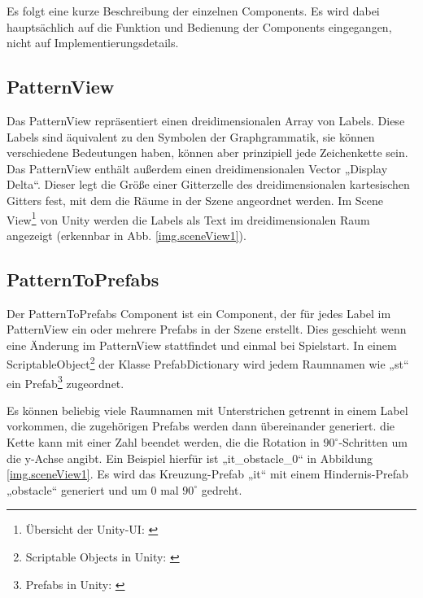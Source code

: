
Es folgt eine kurze Beschreibung der einzelnen Components. Es wird dabei hauptsächlich auf die Funktion und Bedienung der Components eingegangen, nicht auf Implementierungsdetails.

\subsection{PatternView}\label{ss.patternView}

Das PatternView repräsentiert einen dreidimensionalen Array von Labels. Diese Labels sind äquivalent zu den Symbolen der Graphgrammatik, sie können verschiedene Bedeutungen haben, können aber prinzipiell jede Zeichenkette sein. Das PatternView enthält außerdem einen dreidimensionalen Vector „Display Delta“. Dieser legt die Größe einer Gitterzelle des dreidimensionalen kartesischen Gitters fest, mit dem die Räume in der Szene angeordnet werden. Im Scene View\footnote{Übersicht der Unity-UI: \cite[Seite: LearningtheInterface]{unityManual}} von Unity werden die Labels als Text im dreidimensionalen Raum angezeigt (erkennbar in Abb. \ref{img.sceneView1}).


\subsection{PatternToPrefabs}

Der PatternToPrefabs Component ist ein Component, der für jedes Label im PatternView ein oder mehrere Prefabs in der Szene erstellt. Dies geschieht wenn eine Änderung im PatternView stattfindet und einmal bei Spielstart. In einem ScriptableObject\footnote{Scriptable Objects in Unity: \cite[Seite: class-ScriptableObject]{unityManual}} der Klasse PrefabDictionary wird jedem Raumnamen wie „st“ ein Prefab\footnote{Prefabs in Unity: \cite[Seite: LearningtheInterface]{unityManual}} zugeordnet. 

Es können beliebig viele Raumnamen mit Unterstrichen getrennt in einem Label vorkommen, die zugehörigen Prefabs werden dann übereinander generiert. die Kette kann mit einer Zahl beendet werden, die die Rotation in $90^\circ$-Schritten um die y-Achse angibt. Ein Beispiel hierfür ist „it\_obstacle\_0“ in Abbildung \ref{img.sceneView1}. Es wird das Kreuzung-Prefab „it“ mit einem Hindernis-Prefab „obstacle“ generiert und um 0 mal $90^\circ$ gedreht.

